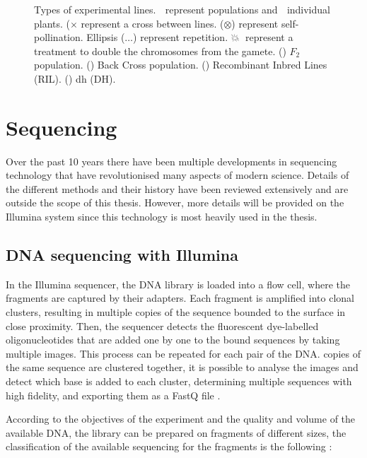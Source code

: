 \begin{figure}
\caption[Types of experimental lines]{Types of experimental lines. 🌾 represent populations and 🌱 individual plants. ($\times$ represent a cross between lines. ($\otimes$) represent self-pollination. Ellipsis ($\ldots$) represent repetition. 💥🌰 represent a treatment to double the chromosomes from the gamete. () $F_{2}$ population. () Back Cross population. () Recombinant Inbred Lines (RIL). () \acrlong{dh} (DH).}
\end{figure}


\section{Sequencing} 
Over the past 10 years there have been multiple developments in sequencing technology that have revolutionised many aspects of modern science. Details of the different methods and their history have been reviewed extensively \citep{Goodwin2016} and are outside the scope of this thesis. 
However, more details will be provided on the Illumina system since this technology is most heavily used in the thesis. 

\subsection{DNA sequencing with Illumina}

In the Illumina sequencer, the DNA library is loaded into a flow cell, where the fragments are captured by their adapters. 
Each fragment is amplified into clonal clusters, resulting in multiple copies of the sequence bounded to the surface in close proximity. 
Then, the sequencer detects the fluorescent dye-labelled oligonucleotides that are added one by one to the bound sequences by taking multiple images. 
This process can be repeated for each pair of the DNA. 
copies of the same sequence are clustered together, it is possible to analyse the images and detect which base is added to each cluster, determining multiple sequences with high fidelity, and exporting them as a FastQ file \citep{Goodwin2016,RNAseqlopedia, truseq}.


According to the objectives of the experiment and the quality and volume of the available DNA, the library can be prepared on fragments of different sizes, the classification of the available sequencing for the fragments is the following \cite{Myllykangas2012,Metzker2010,Shendure2008,Hutchison2007}:

